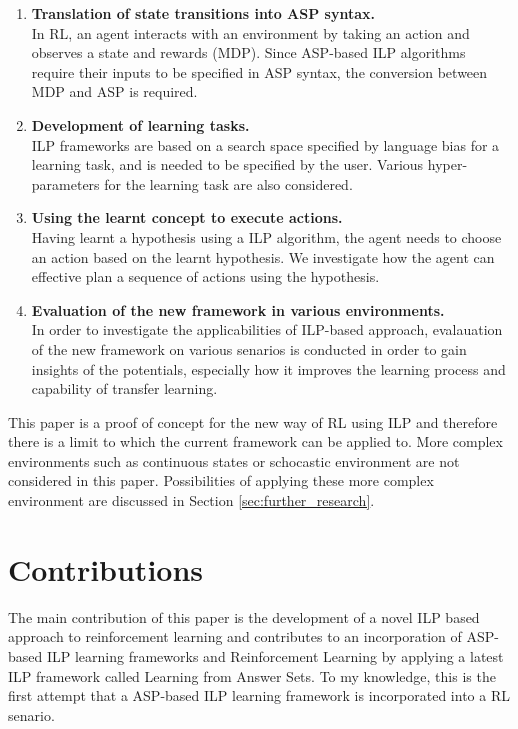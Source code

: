 \newcommand\litem[1]{\item{\bfseries #1.\\}}
\begin{enumerate}
\litem{Translation of state transitions into ASP syntax} 
In RL, an agent interacts with an environment by taking an action and observes a state and rewards (MDP). 
Since ASP-based ILP algorithms require their inputs to be specified in ASP syntax, the conversion between MDP and ASP is required.
\litem{Development of learning tasks} ILP frameworks are based on a search space specified by language bias for a learning task, and is needed to be specified by the user. 
Various hyper-parameters for the learning task are also considered.
\litem{Using the learnt concept to execute actions} 
Having learnt a hypothesis using a ILP algorithm, the agent needs to choose an action based on the learnt hypothesis.
We investigate how the agent can effective plan a sequence of actions using the hypothesis.
\litem{Evaluation of the new framework in various environments}
In order to investigate the applicabilities of ILP-based approach, evalauation of the new framework on various senarios is conducted in order to gain
insights of the potentials, especially how it improves the learning process and capability of transfer learning.
\end{enumerate}

This paper is a proof of concept for the new way of RL using ILP and therefore there is a limit to which the current framework can be applied to.
More complex environments such as continuous states or schocastic environment are not considered in this paper. Possibilities of applying these more complex environment are discussed in Section \ref{sec:further_research}.

\section{Contributions}
\label{contributions}
The main contribution of this paper is the development of a novel ILP based approach to reinforcement learning and contributes to an incorporation of ASP-based ILP learning frameworks and Reinforcement Learning by applying a latest ILP framework called Learning from Answer Sets. 
To my knowledge, this is the first attempt that a ASP-based ILP learning framework is incorporated into a RL senario.


